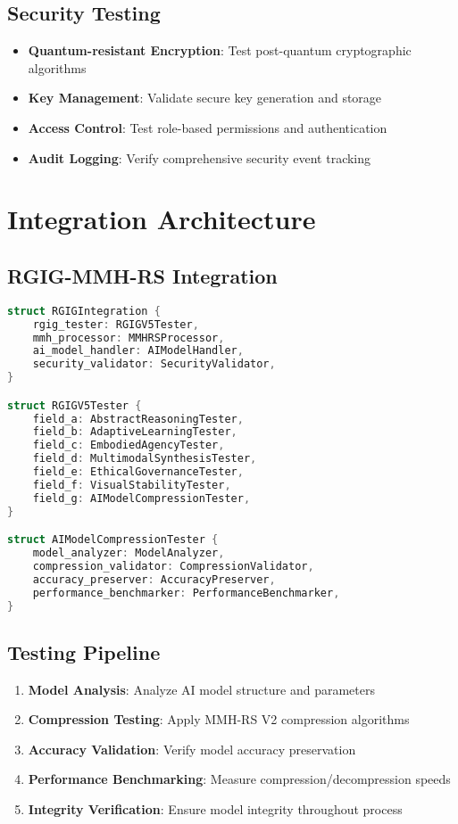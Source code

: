 \documentclass[12pt,a4paper]{article}
\begin{document}
\subsection{Security Testing}
\begin{itemize}
    \item \textbf{Quantum-resistant Encryption}: Test post-quantum cryptographic algorithms
    \item \textbf{Key Management}: Validate secure key generation and storage
    \item \textbf{Access Control}: Test role-based permissions and authentication
    \item \textbf{Audit Logging}: Verify comprehensive security event tracking
\end{itemize}

\section{Integration Architecture}

\subsection{RGIG-MMH-RS Integration}
\begin{lstlisting}[language=Rust, caption=RGIG Integration Architecture]
struct RGIGIntegration {
    rgig_tester: RGIGV5Tester,
    mmh_processor: MMHRSProcessor,
    ai_model_handler: AIModelHandler,
    security_validator: SecurityValidator,
}

struct RGIGV5Tester {
    field_a: AbstractReasoningTester,
    field_b: AdaptiveLearningTester,
    field_c: EmbodiedAgencyTester,
    field_d: MultimodalSynthesisTester,
    field_e: EthicalGovernanceTester,
    field_f: VisualStabilityTester,
    field_g: AIModelCompressionTester,
}

struct AIModelCompressionTester {
    model_analyzer: ModelAnalyzer,
    compression_validator: CompressionValidator,
    accuracy_preserver: AccuracyPreserver,
    performance_benchmarker: PerformanceBenchmarker,
}
\end{lstlisting}

\subsection{Testing Pipeline}
\begin{enumerate}
    \item \textbf{Model Analysis}: Analyze AI model structure and parameters
    \item \textbf{Compression Testing}: Apply MMH-RS V2 compression algorithms
    \item \textbf{Accuracy Validation}: Verify model accuracy preservation
    \item \textbf{Performance Benchmarking}: Measure compression/decompression speeds
    \item \textbf{Integrity Verification}: Ensure model integrity throughout process
\end{enumerate}
\end{document}
